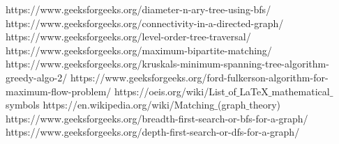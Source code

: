 \documentclass{article}
\begin{document}
\begin{thebibliography}{9}
https://www.geeksforgeeks.org/diameter-n-ary-tree-using-bfs/
https://www.geeksforgeeks.org/connectivity-in-a-directed-graph/
https://www.geeksforgeeks.org/level-order-tree-traversal/
https://www.geeksforgeeks.org/maximum-bipartite-matching/
https://www.geeksforgeeks.org/kruskals-minimum-spanning-tree-algorithm-greedy-algo-2/
https://www.geeksforgeeks.org/ford-fulkerson-algorithm-for-maximum-flow-problem/
https://oeis.org/wiki/List$\_$of$\_$LaTeX$\_$mathematical$\_$symbols
https://en.wikipedia.org/wiki/Matching$\_$(graph$\_$theory)
https://www.geeksforgeeks.org/breadth-first-search-or-bfs-for-a-graph/
https://www.geeksforgeeks.org/depth-first-search-or-dfs-for-a-graph/ \\
\end{thebibliography}
\end{document}
